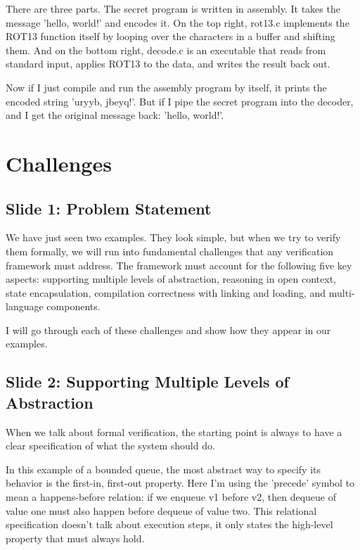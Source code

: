 \documentclass{article}
\begin{document}
There are three parts. The secret program is written in assembly. It takes the
message 'hello, world!' and encodes it. On the top right, rot13.c implements the
ROT13 function itself by looping over the characters in a buffer and shifting
them. And on the bottom right, decode.c is an executable that reads from
standard input, applies ROT13 to the data, and writes the result back out.

Now if I just compile and run the assembly program by itself, it prints the
encoded string 'uryyb, jbeyq!'. But if I pipe the secret program into the
decoder, and I get the original message back: 'hello, world!'.

\section{Challenges}

\subsection{Slide 1: Problem Statement}

We have just seen two examples. They look simple, but when we try to verify them
formally, we will run into fundamental challenges that any verification
framework must address. The framework must account for the following five key
aspects: supporting multiple levels of abstraction, reasoning in open context,
state encapsulation, compilation correctness with linking and loading, and
multi-language components.

I will go through each of these challenges and show how they appear in our
examples.

\subsection{Slide 2: Supporting Multiple Levels of Abstraction}

When we talk about formal verification, the starting point is always to have a
clear specification of what the system should do.

In this example of a bounded queue, the most abstract way to specify its
behavior is the first-in, first-out property. Here I'm using the 'precede' symbol
to mean a happens-before relation: if we enqueue v1 before v2,
then dequeue of value one must also happen before dequeue of value two. This
relational specification doesn't talk about execution steps, it only states the
high-level property that must always hold.
\end{document}
